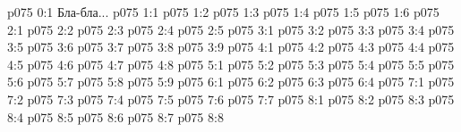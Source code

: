 \author{Солония}
\vs p075 0:1  Бла-бла...
\vs p075 1:1 
\vs p075 1:2 
\vs p075 1:3 
\vs p075 1:4 
\vs p075 1:5 
\vs p075 1:6 
\vs p075 2:1 
\vs p075 2:2 
\vs p075 2:3 
\vs p075 2:4 \pc 
\vs p075 2:5 
\vs p075 3:1 
\vs p075 3:2 
\vs p075 3:3 \pc 
\vs p075 3:4 \pc 
\vs p075 3:5 
\vs p075 3:6 
\vs p075 3:7 \pc 
\vs p075 3:8 
\vs p075 3:9 
\vs p075 4:1 
\vs p075 4:2 
\vs p075 4:3 
\vs p075 4:4 
\vs p075 4:5 
\vs p075 4:6 
\vs p075 4:7 
\vs p075 4:8 
\vs p075 5:1 
\vs p075 5:2 
\vs p075 5:3 
\vs p075 5:4 
\vs p075 5:5 
\vs p075 5:6 
\vs p075 5:7 
\vs p075 5:8 \pc 
\vs p075 5:9 \pc 
{}
\vs p075 6:1 
\vs p075 6:2 
\vs p075 6:3 
\vs p075 6:4 
\vs p075 7:1 
\vs p075 7:2 
\vs p075 7:3 
\vs p075 7:4 
\vs p075 7:5 
\vs p075 7:6 
\vs p075 7:7 \pc 
{}
\vs p075 8:1 
\vs p075 8:2 
\vs p075 8:3 
\vs p075 8:4 \pc 
\vs p075 8:5 
\vs p075 8:6 \pc 
\vs p075 8:7 
\vsetoff
\vs p075 8:8 
\quizlink
